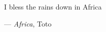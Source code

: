 \documentclass[12pt, twocolumn, x11names]{article}
\begin{document}
\BgThispage
\thispagestyle{empty}

\vspace*{21cm}
\setlength{}
\epigraph{\Huge I bless the rains down in Africa}{--- \emph{Africa}, Toto}
\clearpage

\newpage
\thispagestyle{empty}
\mbox{}

\newpage
\restoregeometry
\thispagestyle{empty}
\onecolumn{\tableofcontents}

\newpage
\thispagestyle{empty}
\mbox{}

\twocolumn

\clearpage
\setcounter{page}{1}










\onecolumn{}
\end{document}
